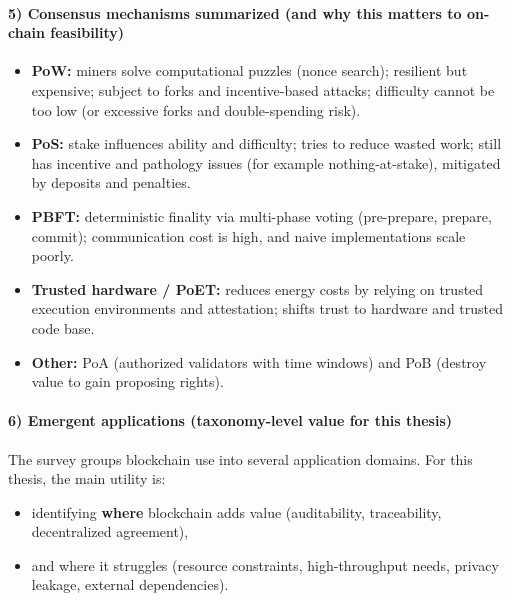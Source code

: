 \documentclass[11pt,a4paper]{article}
\begin{document}
\paragraph{5) Consensus mechanisms summarized (and why this matters to on-chain feasibility)}
\begin{itemize}[leftmargin=*]
  \item \textbf{PoW:} miners solve computational puzzles (nonce search); resilient but expensive; subject to forks and incentive-based attacks; difficulty cannot be too low (or excessive forks and double-spending risk).
  \item \textbf{PoS:} stake influences ability and difficulty; tries to reduce wasted work; still has incentive and pathology issues (for example nothing-at-stake), mitigated by deposits and penalties.
  \item \textbf{PBFT:} deterministic finality via multi-phase voting (pre-prepare, prepare, commit); communication cost is high, and naive implementations scale poorly.
  \item \textbf{Trusted hardware / PoET:} reduces energy costs by relying on trusted execution environments and attestation; shifts trust to hardware and trusted code base.
  \item \textbf{Other:} PoA (authorized validators with time windows) and PoB (destroy value to gain proposing rights).
\end{itemize}

\paragraph{6) Emergent applications (taxonomy-level value for this thesis)}
The survey groups blockchain use into several application domains. For this thesis, the main utility is:
\begin{itemize}[leftmargin=*]
  \item identifying \textbf{where} blockchain adds value (auditability, traceability, decentralized agreement),
  \item and where it struggles (resource constraints, high-throughput needs, privacy leakage, external dependencies).
\end{itemize}
\end{document}
